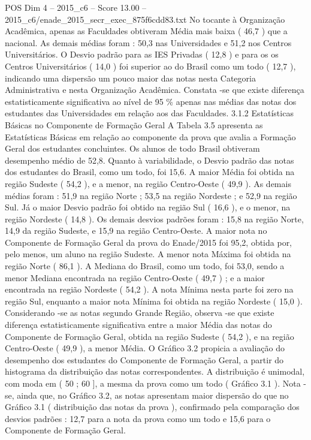 \begin{textsample}{POS Dim 4 – 2015\_c6 – Score 13.00 – 2015\_c6/enade\_2015\_secr\_exec\_875f6cdd83.txt}
No tocante à Organização Acadêmica, apenas as Faculdades obtiveram Média mais baixa ( 46,7 ) que a nacional.
As demais médias foram : 50,3 nas Universidades e 51,2 nos Centros Universitários.
O Desvio padrão para as IES Privadas ( 12,8 ) e para os os Centros Universitários ( 14,0 ) foi superior ao do Brasil como um todo ( 12,7 ), indicando uma dispersão um pouco maior das notas nesta Categoria Administrativa e nesta Organização Acadêmica.
Constata -se que existe diferença estatisticamente significativa ao nível de 95 \% apenas nas médias das notas dos estudantes das Universidades em relação aos das Faculdades. 3.1.2 Estatísticas Básicas no Componente de Formação Geral A Tabela 3.5 apresenta as Estatísticas Básicas em relação ao componente da prova que avalia a Formação Geral dos estudantes concluintes.
Os alunos de todo Brasil obtiveram desempenho médio de 52,8.
Quanto à variabilidade, o Desvio padrão das notas dos estudantes do Brasil, como um todo, foi 15,6.
A maior Média foi obtida na região Sudeste ( 54,2 ), e a menor, na região Centro-Oeste ( 49,9 ).
As demais médias foram : 51,9 na região Norte ; 53,5 na região Nordeste ; e 52,9 na região Sul.
Já o maior Desvio padrão foi obtido na região Sul ( 16,6 ), e o menor, na região Nordeste ( 14,8 ).
Os demais desvios padrões foram : 15,8 na região Norte, 14,9 da região Sudeste, e 15,9 na região Centro-Oeste.
A maior nota no Componente de Formação Geral da prova do Enade/2015 foi 95,2, obtida por, pelo menos, um aluno na região Sudeste.
A menor nota Máxima foi obtida na região Norte ( 86,1 ).
A Mediana do Brasil, como um todo, foi 53,0, sendo a menor Mediana encontrada na região Centro-Oeste ( 49,7 ) ; e a maior encontrada na região Nordeste ( 54,2 ).
A nota Mínima nesta parte foi zero na região Sul, enquanto a maior nota Mínima foi obtida na região Nordeste ( 15,0 ).
Considerando -se as notas segundo Grande Região, observa -se que existe diferença estatisticamente significativa entre a maior Média das notas do Componente de Formação Geral, obtida na região Sudeste ( 54,2 ), e na região Centro-Oeste ( 49,9 ), a menor Média.
O Gráfico 3.2 propicia a avaliação do desempenho dos estudantes do Componente de Formação Geral, a partir do histograma da distribuição das notas correspondentes.
A distribuição é unimodal, com moda em ( 50 ; 60 ], a mesma da prova como um todo ( Gráfico 3.1 ).
Nota -se, ainda que, no Gráfico 3.2, as notas apresentam maior dispersão do que no Gráfico 3.1 ( distribuição das notas da prova ), confirmado pela comparação dos desvios padrões : 12,7 para a nota da prova como um todo e 15,6 para o Componente de Formação Geral.

\end{textsample}
